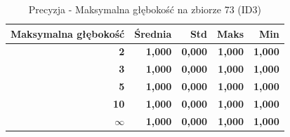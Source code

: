 \begin{table}[htbp]
\centering
\small
\setlength{\tabcolsep}{6pt}
\renewcommand{\arraystretch}{1.2}
\caption{Precyzja - Maksymalna głębokość na zbiorze 73 (ID3)}
\label{tab:ID3_max_depth_73_precision}
\begin{tabular}{r|r|r|r|r}
\toprule
Maksymalna głębokość & Średnia & Std & Maks & Min \\
\hline
\textbf{2} & \textbf{1,000} & \textbf{0,000} & \textbf{1,000} & \textbf{1,000} \\
\textbf{3} & \textbf{1,000} & \textbf{0,000} & \textbf{1,000} & \textbf{1,000} \\
\textbf{5} & \textbf{1,000} & \textbf{0,000} & \textbf{1,000} & \textbf{1,000} \\
\textbf{10} & \textbf{1,000} & \textbf{0,000} & \textbf{1,000} & \textbf{1,000} \\
\textbf{$\infty$} & \textbf{1,000} & \textbf{0,000} & \textbf{1,000} & \textbf{1,000} \\
\bottomrule
\end{tabular}
\end{table}